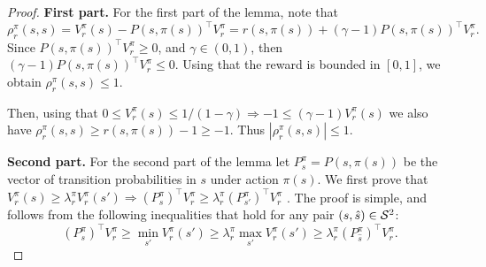 \begin{proof}
{\bf First part.} For the first part of the lemma, note that
\[
\rho_r^\pi(s,s) = V_r^\pi(s) -  P(s,\pi(s))^\top V_r^\pi = r(s,\pi(s)) + (\gamma-1)P(s,\pi(s))^\top V_r^\pi.
\]
Since $P(s,\pi(s))^\top V_r^\pi\geq 0$, and  $\gamma \in (0,1)$, then $(\gamma-1)P(s,\pi(s))^\top V_r^\pi\leq 0$. Using that the reward is bounded in $[0,1]$, we obtain $\rho_r^\pi(s,s)\leq 1$.

Then, using that $0\leq V_r^\pi(s)\leq 1/(1-\gamma) \Rightarrow  -1 \leq (\gamma-1)V_r^\pi(s) $  we also have 
 $\rho_r^\pi(s,s) \geq r(s,\pi(s)) -1 \geq -1$. Thus $|\rho_r^\pi(s,s)|\leq 1$.

 {\bf Second part.} For the second part of the lemma let $P_s^\pi=P(s,\pi(s))$ be the vector of transition probabilities in $s$ under action $\pi(s)$. We first prove that $V_r^\pi(s)\geq \lambda_r^\pi V_r^\pi(s') \Rightarrow (P_s^\pi)^\top V_r^\pi \geq \lambda_r^\pi (P_{s'}^\pi)^\top V_r^\pi$ . The proof is simple, and follows from the following inequalities that hold for any pair $(s,\hat s)\in {\cal S}^2$:
 \[(P_s^\pi)^\top V_r^\pi\geq \min_{s'} V_r^\pi(s')\geq \lambda_r^\pi \max_{s'} V_r^\pi(s')\geq \lambda_r^\pi (P_{\hat s}^\pi)^\top V_r^\pi.\]


\end{proof}
